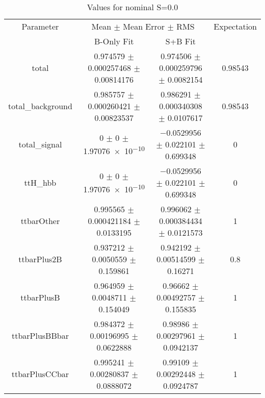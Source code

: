 \begin{table}
\centering
\caption{Values for nominal S=0.0}
\begin{tabular}{cccc}
\toprule
Parameter & \multicolumn{2}{c}{Mean $\pm$ Mean Error $\pm$ RMS} & Expectation\\
 & B-Only Fit & S+B Fit & \\
\midrule
total & \num{0.974579} $\pm$ \num{0.000257468} $\pm$ \num{0.00814176} & \num{0.974506} $\pm$ \num{0.000259796} $\pm$ \num{0.0082154} & \num{0.98543}\\
total\_background & \num{0.985757} $\pm$ \num{0.000260421} $\pm$ \num{0.00823537} & \num{0.986291} $\pm$ \num{0.000340308} $\pm$ \num{0.0107617} & \num{0.98543}\\
total\_signal & \num{0} $\pm$ \num{0} $\pm$ \num{1.97076e-10} & \num{-0.0529956} $\pm$ \num{0.022101} $\pm$ \num{0.699348} & \num{0}\\
ttH\_hbb & \num{0} $\pm$ \num{0} $\pm$ \num{1.97076e-10} & \num{-0.0529956} $\pm$ \num{0.022101} $\pm$ \num{0.699348} & \num{0}\\
ttbarOther & \num{0.995565} $\pm$ \num{0.000421184} $\pm$ \num{0.0133195} & \num{0.996062} $\pm$ \num{0.000384434} $\pm$ \num{0.0121573} & \num{1}\\
ttbarPlus2B & \num{0.937212} $\pm$ \num{0.0050559} $\pm$ \num{0.159861} & \num{0.942192} $\pm$ \num{0.00514599} $\pm$ \num{0.16271} & \num{0.8}\\
ttbarPlusB & \num{0.964959} $\pm$ \num{0.0048711} $\pm$ \num{0.154049} & \num{0.96662} $\pm$ \num{0.00492757} $\pm$ \num{0.155835} & \num{1}\\
ttbarPlusBBbar & \num{0.984372} $\pm$ \num{0.00196995} $\pm$ \num{0.0622888} & \num{0.98986} $\pm$ \num{0.00297961} $\pm$ \num{0.0942137} & \num{1}\\
ttbarPlusCCbar & \num{0.995241} $\pm$ \num{0.00280837} $\pm$ \num{0.0888072} & \num{0.99109} $\pm$ \num{0.00292448} $\pm$ \num{0.0924787} & \num{1}\\
\bottomrule
\end{tabular}
\end{table}